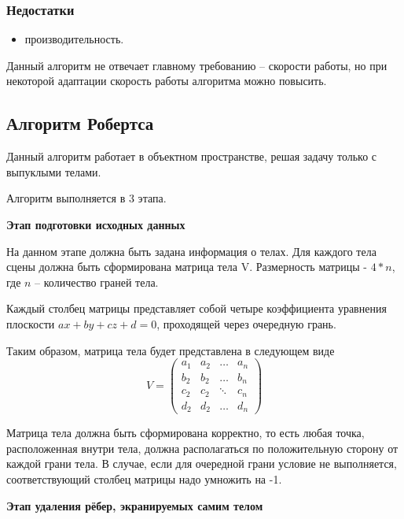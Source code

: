 \subsubsection*{Недостатки}
\begin{itemize}
\item	производительность.
\end{itemize}

Данный алгоритм не отвечает главному требованию – скорости работы, но при некоторой адаптации скорость работы алгоритма можно повысить.

\subsection{Алгоритм Робертса}
Данный алгоритм работает в объектном пространстве, решая задачу только с выпуклыми телами.

Алгоритм выполняется в 3 этапа.

\textbf{Этап подготовки исходных данных}

На данном этапе должна быть задана информация о телах. Для каждого тела сцены должна быть сформирована матрица тела V. Размерность матрицы - $4*n$, где $n$ – количество граней тела.

Каждый столбец матрицы представляет собой четыре коэффициента уравнения плоскости  $ax+by+cz+d=0$, проходящей через очередную грань.

Таким образом, матрица тела будет представлена в следующем виде
\begin{equation}
	\label{eq:matr}
	V = \begin{pmatrix}
		a_{1} & a_{2} & \ldots & a_{n}\\
		b_{2} & b_{2} & \ldots & b_{n}\\
		c_{2} & c_{2} & \ddots & c_{n}\\
		d_{2} & d_{2} & \ldots & d_{n}
	\end{pmatrix}
\end{equation}

Матрица тела должна быть сформирована корректно, то есть любая точка, расположенная внутри тела, должна располагаться по положительную сторону от каждой грани тела. В случае, если для очередной грани условие не выполняется, соответствующий столбец матрицы надо умножить на -1. 

\textbf{Этап удаления рёбер, экранируемых самим телом}

